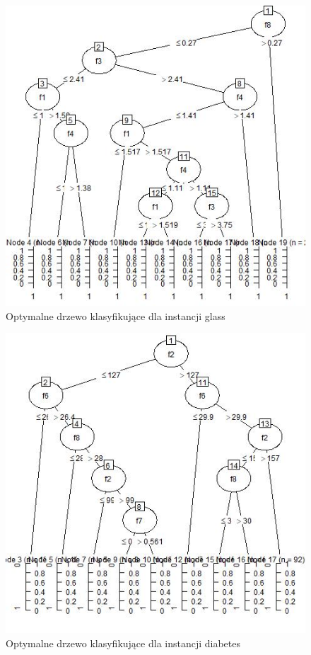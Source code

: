 \documentclass[12pt,a4paper]{article}
\begin{document}
\begin{figure}[H]
\centering
\includegraphics[width=1\textwidth]{glassOptimal.jpg}
\caption{Optymalne drzewo klasyfikujące dla instancji glass}
\end{figure}

\begin{figure}[H]
\centering
\includegraphics[width=1\textwidth]{diabetesOptimal.jpg}
\caption{Optymalne drzewo klasyfikujące dla instancji diabetes}
\end{figure}
\end{document}
